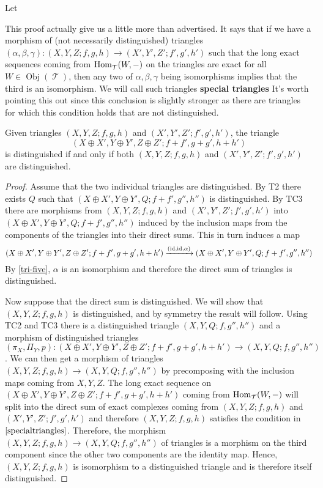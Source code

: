 \documentclass[11pt]{article}
\DeclareMathOperator{\ob}{Obj}
\DeclareMathOperator{\TT}{\mathcal{T}}
\begin{document}
\begin{defn}
Let 
\end{defn}

\begin{rmk}\label{specialtriangles}
This proof actually give us a little more than advertised. It says that if we have a morphism of (not necessarily distinguished) triangles $(\alpha,\beta,\gamma): (X,Y,Z; f,g,h) \to (X',Y',Z'; f',g',h')$ such that the long exact sequences coming from $\Hom_{\TT}(W,-)$ on the triangles are exact for all $W \in \ob(\TT)$, then any two of $\alpha,\beta,\gamma$ being isomorphisms implies that the third is an isomorphism. We will call such triangles \textbf{special triangles} It's worth pointing this out since this conclusion is slightly stronger as there are triangles for which this condition holds that are not distinguished.
\end{rmk}

\begin{cor}\label{sumoftriangles}
	Given triangles $(X,Y,Z; f,g,h)$ and $(X',Y',Z'; f',g',h')$, the triangle
	\[
		(X \oplus X', Y \oplus Y', Z \oplus Z'; f+f', g+g', h+h')
	\]
	is distinguished if and only if both $(X,Y,Z; f,g,h)$ and $(X',Y',Z'; f',g',h')$ are distinguished.
\end{cor}
\begin{proof}
Assume that the two individual triangles are distinguished. By T2 there exists $Q$ such that $(X \oplus X', Y \oplus Y', Q; f+f', g'', h'')$ is distinguished. By TC3 there are morphisms from $(X,Y,Z; f,g,h)$ and $(X',Y',Z'; f',g',h')$ into $(X \oplus X', Y \oplus Y', Q; f+f', g'', h'')$ induced by the inclusion maps from the components of the triangles into their direct sums. This in turn induces a map 
\[
	(X \oplus X', Y \oplus Y', Z \oplus Z'; f+f', g+g', h+h') \xrightarrow{(\operatorname{id},\operatorname{id},\alpha)}(X \oplus X', Y \oplus Y', Q; f+f', g'', h'')
\]
By \autoref{tri-five}, $\alpha$ is an isomorphism and therefore the direct sum of triangles is distinguished.

Now suppose that the direct sum is distinguished. We will show that $(X,Y,Z; f,g,h)$ is distinguished, and by symmetry the result will follow. Using TC2 and TC3 there is a distinguished triangle $(X,Y,Q; f,g'',h'')$ and a morphism of distinguished triangles $(\pi_X,\Pi_Y, p): (X \oplus X', Y \oplus Y', Z \oplus Z'; f+f', g+g', h+h') \to (X,Y,Q; f,g'',h'')$. We can then get a morphism of triangles $(X,Y,Z; f,g,h) \to (X,Y,Q; f,g'',h'')$ by precomposing with the inclusion maps coming from $X,Y,Z$. The long exact sequence on $(X \oplus X', Y \oplus Y', Z \oplus Z'; f+f', g+g', h+h')$ coming from $\Hom_{\TT}(W,-)$ will split into the direct sum of exact complexes coming from $(X,Y,Z; f,g,h)$ and $(X',Y',Z'; f',g',h')$ and therefore $(X,Y,Z; f,g,h)$ satisfies the condition in $\autoref{specialtriangles}$. Therefore, the morphism $(X,Y,Z; f,g,h) \to (X,Y,Q; f,g'',h'')$ of triangles is a morphism on the third component since the other two components are the identity map. Hence, $(X,Y,Z; f,g,h)$ is isomorphism to a distinguished triangle and is therefore itself distinguished.
\end{proof}
\end{document}
